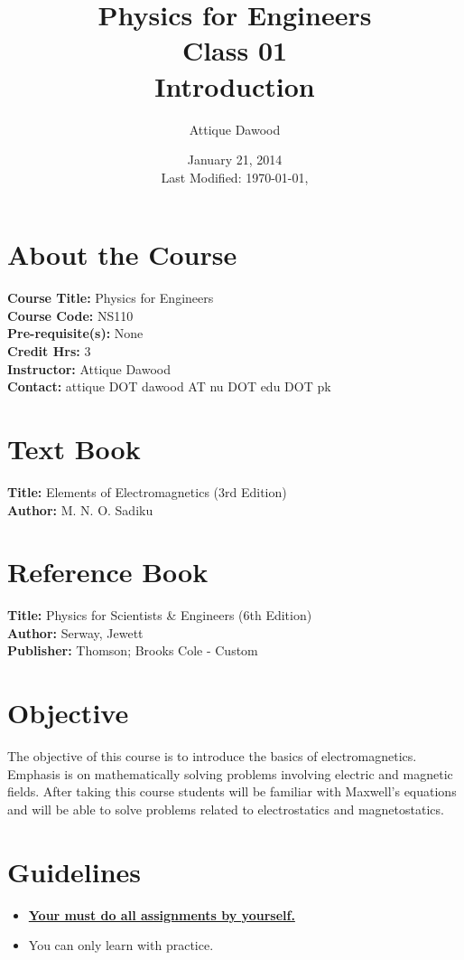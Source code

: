 \documentclass[12pt,a4paper]{article}
\title{\vspace{-2cm}Physics for Engineers\\Class 01\\Introduction}
\author{Attique Dawood}
\date{January 21, 2014\\[0.2cm] Last Modified: \today, \currenttime}
\begin{document}
\maketitle
\section{About the Course}
\textbf{Course Title:} Physics for Engineers\\
\textbf{Course Code:} NS110\\
\textbf{Pre-requisite(s):} None\\
\textbf{Credit Hrs:} 3\\
\textbf{Instructor:} Attique Dawood\\
\textbf{Contact:} attique DOT dawood AT nu DOT edu DOT pk\\
\section{Text Book}
\textbf{Title:} Elements of Electromagnetics (3rd Edition)\\
\textbf{Author:} M. N. O. Sadiku\\
\section{Reference Book}
\textbf{Title:} Physics for Scientists \& Engineers  (6th Edition)\\
\textbf{Author:} Serway, Jewett\\
\textbf{Publisher:} Thomson; Brooks Cole - Custom\\
\section{Objective}
The objective of this course is to introduce the basics of electromagnetics. Emphasis is on mathematically solving problems involving electric and magnetic fields. After taking this course students will be familiar with Maxwell’s equations and will be able to solve problems related to electrostatics and magnetostatics.
\section{Guidelines}
\begin{itemize}
\item \textbf{\underline{Your must do all assignments by yourself.}}
\item You can only learn with practice.
\end{itemize}
\end{document}
